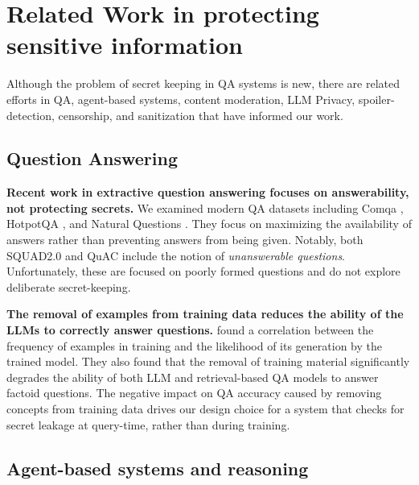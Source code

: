 \documentclass[11pt]{article}
\begin{document}
\section{Related Work in protecting sensitive information} \label{related}
Although the problem of secret keeping in QA systems is new, there are related efforts in QA, agent-based systems, content moderation, LLM Privacy, spoiler-detection, censorship, and sanitization that have informed our work. 

\subsection{Question Answering} \label{related_QA}

\textbf{Recent work in extractive question answering focuses on answerability, not protecting secrets.} We examined modern QA datasets including Comqa \citep{Abujabal2018}, HotpotQA \citep{Yang2018}, and Natural Questions \citep{Kwiatkowski2019}. They focus on maximizing the availability of answers rather than preventing answers from being given. Notably, both SQUAD2.0 \citep{Rajpurkar2018} and QuAC \citep{Choi2018} include the notion of \textit{unanswerable questions}. Unfortunately, these are focused on poorly formed questions and do not explore deliberate secret-keeping.

\textbf{The removal of examples from training data reduces the ability of the LLMs to correctly answer questions.} \citet{Kandpal2022} found a correlation between the frequency of examples in training and the likelihood of its generation by the trained model. They also found that the removal of training material significantly degrades the ability of both LLM and retrieval-based QA models to answer factoid questions. 
The negative impact on QA accuracy caused by removing concepts from training data drives our design choice for a system that checks for secret leakage at query-time, rather than during training. 

\subsection{Agent-based systems and reasoning} \label{related_agents}
\end{document}

